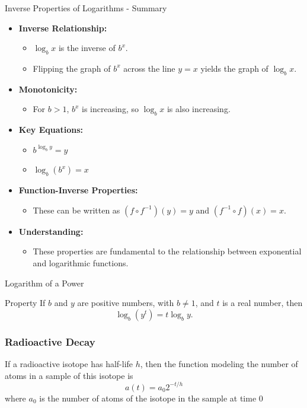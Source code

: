 \documentclass{beamer}
\begin{document}
  \begin{frame}{Inverse Properties of Logarithms - Summary}
    \begin{itemize}
      \item \textbf{Inverse Relationship:}
        \begin{itemize}
          \item \(\log_b x\) is the inverse of \(b^x\).
          \item Flipping the graph of \(b^x\) across the line \(y=x\) yields the graph of \(\log_b x\).
        \end{itemize}
      \item \textbf{Monotonicity:}
        \begin{itemize}
          \item For \(b>1\), \(b^x\) is increasing, so \(\log_b x\) is also increasing.
        \end{itemize}
      \item \textbf{Key Equations:}
        \begin{itemize}
          \item \(b^{\log_b y} = y\)
          \item \(\log_b (b^x) = x\)
        \end{itemize}
      \item \textbf{Function-Inverse Properties:}
        \begin{itemize}
          \item These can be written as \((f \circ f^{-1})(y) = y\) and \((f^{-1} \circ f)(x) = x\).
        \end{itemize}
      \item \textbf{Understanding:}
        \begin{itemize}
          \item These properties are fundamental to the relationship between exponential and logarithmic functions.
        \end{itemize}
    \end{itemize}
  \end{frame}

  \begin{frame}{Logarithm of a Power}
    \begin{block}{Property}
      If \(b\) and \(y\) are positive numbers, with \(b \neq 1\), and \(t\) is a real number, then
      \[
        \log_b\left(y^t\right) = t \log_b y.
      \]
    \end{block}
  \end{frame}
\begin{frame}
  \frametitle{Radioactive Decay}
  If a radioactive isotope has half-life \(h\), then the function modeling the number of
  atoms in a sample of this isotope is
  \[ a(t) = a_{0}2^{-t/h}\]
  where \(a_{0}\) is the number of atoms of the isotope in the sample at time \(0\)
  \end{frame} 
\end{document}
